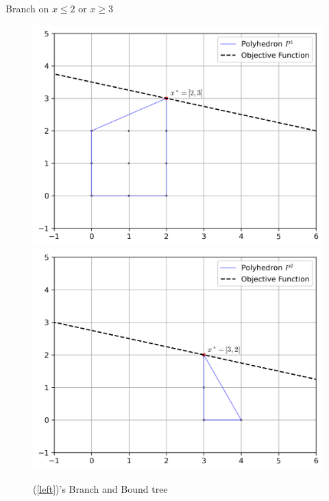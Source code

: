 \documentclass{beamer}
\begin{document}
\begin{frame}[t]
\begin{columns}[T]
\begin{column}{0.7\textwidth}
\begin{figure}[h]
{					}
					\label{p:root}
				\end{figure}
				\vspace{-.25cm}
				\centering
				Branch on $ x \leq 2 $ or $ x \geq 3 $
				\vspace{-.25cm}
				\begin{figure}[]
					\centering
					\includegraphics[width=.45\textwidth]{P1.png}
					\hfill
					\includegraphics[width=.45\textwidth]{P2.png}
					\captionsetup{font=footnotesize,labelfont=footnotesize}
					\caption{(\ref{left})'s Branch and Bound tree}
					\label{p:before}
				\end{figure}
			\end{column}
		\end{columns}
		\normalsize
	\end{frame}
\end{document}
